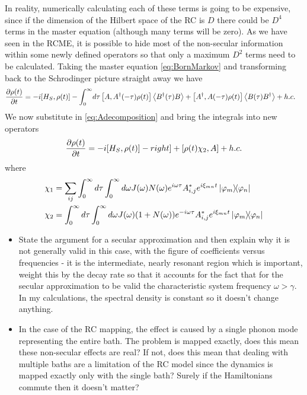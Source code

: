 \documentclass[]{article}
\begin{document}
In reality, numerically calculating each of these terms is going to be expensive, since if the dimension of the Hilbert space of the RC is $D$ there could be $D^4$ terms in the master equation (although many terms will be zero). As we have seen in the RCME, it is possible to hide most of the non-secular information within some newly defined operators so that only a maximum $D^2$ terms need to be calculated. Taking the master equation \ref{eq:BornMarkov} and transforming back to the Schrodinger picture straight away we have
\begin{align}
	\begin{split}
		\label{eq:BornMarkovSchrod}
		\pdv{\rho(t)}{t} = -i[H_S, \rho(t)] - \int_{0}^{\infty}& d\tau  \left[A, A^{\dagger}(-\tau)\rho(t)\right] \expval{B^{\dagger}(\tau)B} + \left[A^{\dagger},A(-\tau)\rho(t)\right] \expval{B(\tau)B^{\dagger}} + h.c.
	\end{split}
\end{align}
We now substitute in \ref{eq:Adecomposition} and bring the integrals into new operators
\begin{align}
	\begin{split}
		\pdv{\rho(t)}{t} = -i[H_S, \rho(t)] - right]  + \left[\rho(t)\chi_2,A\right] + h.c.
	\end{split}
\end{align}
where 
\begin{align}
	\begin{split}
\chi_1 &= \sum_{i j}\int_{0}^{\infty}d\tau\int_{0}^{\infty}d\omega J(\omega)N(\omega)e^{i\omega\tau}A_{i,j}^* e^{i\xi_{mn}t}\dyad{\varphi_m}{\varphi_n} \\
\chi_2 &= \int_{0}^{\infty}d\tau\int_{0}^{\infty}d\omega J(\omega)(1+N(\omega))e^{-i\omega\tau}A_{i,j}^* e^{i\xi_{mn}t}\dyad{\varphi_m}{\varphi_n} 
	\end{split}
\end{align}

\begin{itemize}
	\item State the argument for a secular approximation and then explain why it is not generally valid in this case, with the figure of coefficients versus frequencies - it is the intermediate, nearly resonant region which is important, weight this by the decay rate so that it accounts for the fact that for the secular approximation to be valid the characteristic system frequency $\omega>\gamma$. In my calculations, the spectral density is constant so it doesn't change anything.
	\item In the case of the RC mapping, the effect is caused by a single phonon mode representing the entire bath. The problem is mapped exactly, does this mean these non-secular effects are real? If not, does this mean that dealing with multiple baths are a limitation of the RC model since the dynamics is mapped exactly only with the single bath? Surely if the Hamiltonians commute then it doesn't matter?
	
	
\end{itemize}
\end{document}
